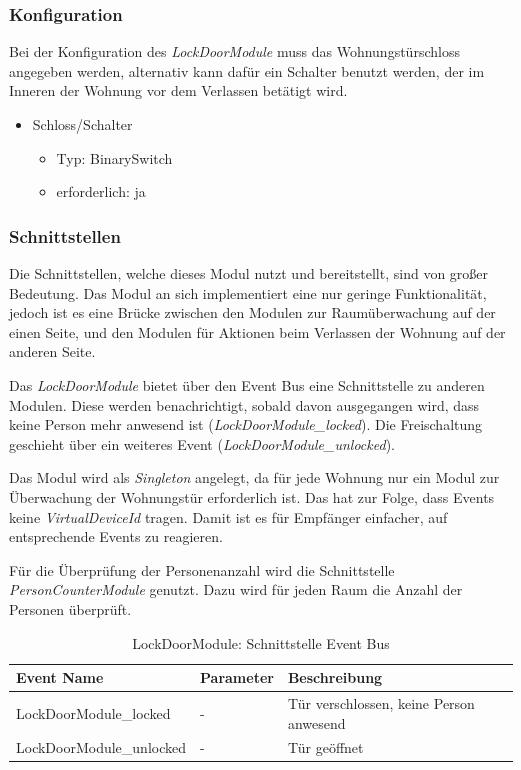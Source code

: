 \subsubsection{Konfiguration}
Bei der Konfiguration des \emph{LockDoorModule} muss das Wohnungstürschloss angegeben werden, alternativ kann dafür ein Schalter benutzt werden, der im Inneren der Wohnung vor dem Verlassen betätigt wird. 
\begin{itemize}
	\item Schloss/Schalter
	\begin{itemize}
		\item Typ: BinarySwitch
		\item erforderlich: ja
	\end{itemize}
\end{itemize}

\subsubsection{Schnittstellen}
Die Schnittstellen, welche dieses Modul nutzt und bereitstellt, sind von großer Bedeutung. Das Modul an sich implementiert eine nur geringe Funktionalität, jedoch ist es eine Brücke zwischen den Modulen zur Raumüberwachung auf der einen Seite, und den Modulen für Aktionen beim Verlassen der Wohnung auf der anderen Seite.

Das \emph{LockDoorModule} bietet über den Event Bus eine Schnittstelle zu anderen Modulen. Diese werden benachrichtigt, sobald davon ausgegangen wird, dass keine Person mehr anwesend ist (\emph{LockDoorModule\_locked}). Die Freischaltung geschieht über ein weiteres Event (\emph{LockDoorModule\_unlocked}).

Das Modul wird als \emph{Singleton} angelegt, da für jede Wohnung nur ein Modul zur Überwachung der Wohnungstür erforderlich ist. Das hat zur Folge, dass Events keine \emph{VirtualDeviceId} tragen. Damit ist es für Empfänger einfacher, auf entsprechende Events zu reagieren.

Für die Überprüfung der Personenanzahl wird die Schnittstelle \emph{PersonCounterModule} genutzt. Dazu wird für jeden Raum die Anzahl der Personen überprüft.

\begin{table}[h!]
\begin{tabularx}{\textwidth}{
		 >{\hsize=1.25\hsize}X %
		>{\hsize=0.5\hsize\centering}X %
		>{\hsize=1.25\hsize}X %
	}
	\hline
	\textbf{Event Name}					& \textbf{Parameter}	& \textbf{Beschreibung} \\
	\hline LockDoorModule\_locked		& - 					& Tür verschlossen, keine Person anwesend \\ 
	\hline LockDoorModule\_unlocked		& - 			 		& Tür geöffnet \\ 
	\hline
\end{tabularx}
\caption{LockDoorModule: Schnittstelle Event Bus}
\end{table}


